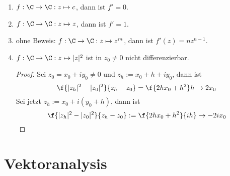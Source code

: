 \documentclass[a4paper,10pt]{scrartcl}
\begin{document}
\begin{ex*}
	\begin{enumerate}[1)]
		\item 
			$f: \C \to \C : z\mapsto c$, dann ist $f'=0$.
		\item
			$f: \C \to \C : z\mapsto z$, dann ist $f'=1$.
		\item
			ohne Beweis: $f:\C \to \C :z\mapsto z^m$, dann ist $f'(z) = nz^{n-1}$.
		\item
			$f: \C\to \C : z\mapsto |z|^2$ ist in $z_0\neq 0$ nicht differenzierbar.
			\begin{proof}
				Sei $z_0 = x_0+iy_0 \neq 0$ und $z_h:= x_0+h +iy_0$, dann ist
				\[
					\f {|z_h|^2 -|z_0|^2}{z_h-z_0} = \f {2hx_0+h^2}h \to 2x_0
				\]
				Sei jetzt $z_h := x_0 + i(y_0+h)$, dann ist
				\[
					\f {|z_h|^2 -|z_0|^2}{z_h-z_0} := \f {2hx_0+h^2}{ih} \to -2ix_0
				\]
			\end{proof}
	\end{enumerate}
\end{ex*}
\section{Vektoranalysis}
\end{document}
